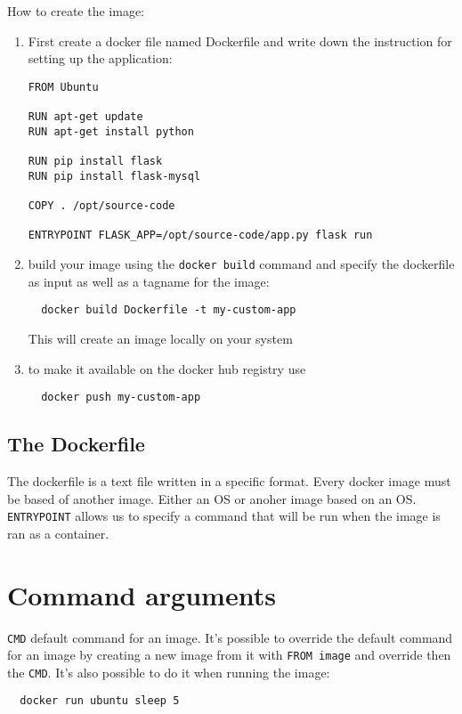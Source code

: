 \documentclass[french]{article}
\begin{document}
How to create the image:
\begin{enumerate}
  \item First create a docker file named Dockerfile and write down the instruction for setting up the application:
\begin{verbatim}
FROM Ubuntu

RUN apt-get update
RUN apt-get install python

RUN pip install flask
RUN pip install flask-mysql

COPY . /opt/source-code

ENTRYPOINT FLASK_APP=/opt/source-code/app.py flask run
\end{verbatim}
\item build your image using the \verb|docker build| command and specify the dockerfile as input as well as a tagname for the image:
\begin{verbatim}
  docker build Dockerfile -t my-custom-app
\end{verbatim}
This will create an image locally on your system
\item to make it available on the docker hub registry use
\begin{verbatim}
  docker push my-custom-app
\end{verbatim}
\end{enumerate}

\subsection{The Dockerfile}

The dockerfile is a text file written in a specific format. Every docker image must be based of another image. Either an OS or anoher image based on an OS. \\
\verb|ENTRYPOINT| allows us to specify a command that will be run when the image is ran as a container.

\section{Command arguments}

\verb|CMD| default command for an image. It's possible to override the default command for an image by creating a new image from it with \verb|FROM image| and override then the \verb|CMD|.
It's also possible to do it when running the image:
\begin{verbatim}
  docker run ubuntu sleep 5
\end{verbatim}
\end{document}
